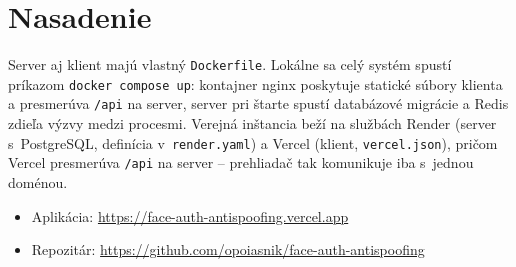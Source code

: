 
\section{Nasadenie}

Server aj klient majú vlastný \texttt{Dockerfile}. Lokálne sa celý systém spustí
príkazom \texttt{docker compose up}: kontajner nginx poskytuje statické súbory klienta
a presmerúva \texttt{/api} na server, server pri štarte spustí databázové migrácie
a Redis zdieľa výzvy medzi procesmi. Verejná inštancia beží na službách Render
(server s~PostgreSQL, definícia v~\texttt{render.yaml}) a Vercel (klient,
\texttt{vercel.json}), pričom Vercel presmerúva \texttt{/api} na server -- prehliadač
tak komunikuje iba s~jednou doménou.

\begin{itemize}
  \item Aplikácia: \url{https://face-auth-antispoofing.vercel.app}
  \item Repozitár: \url{https://github.com/opoiasnik/face-auth-antispoofing}
\end{itemize}
